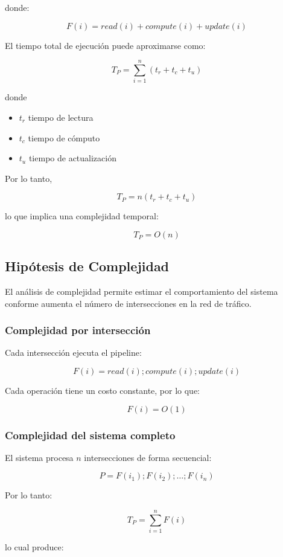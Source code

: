 \documentclass[12pt]{article}
\begin{document}
donde:

\[
F(i) = read(i) + compute(i) + update(i)
\]

El tiempo total de ejecución puede aproximarse como:

\[
T_P = \sum_{i=1}^{n} (t_r + t_c + t_u)
\]

donde

\begin{itemize}
\item \(t_r\) tiempo de lectura
\item \(t_c\) tiempo de cómputo
\item \(t_u\) tiempo de actualización
\end{itemize}

Por lo tanto,

\[
T_P = n(t_r + t_c + t_u)
\]

lo que implica una complejidad temporal:

\[
T_P = O(n)
\]

\subsection{Hipótesis de Complejidad}

El análisis de complejidad permite estimar el comportamiento del sistema conforme aumenta el número de intersecciones en la red de tráfico.

\subsubsection{Complejidad por intersección}

Cada intersección ejecuta el pipeline:

\[
F(i) = read(i); compute(i); update(i)
\]

Cada operación tiene un costo constante, por lo que:

\[
F(i) = O(1)
\]

\subsubsection{Complejidad del sistema completo}

El sistema procesa \(n\) intersecciones de forma secuencial:

\[
P = F(i_1); F(i_2); \dots ; F(i_n)
\]

Por lo tanto:

\[
T_P = \sum_{i=1}^{n} F(i)
\]

lo cual produce:
\end{document}
